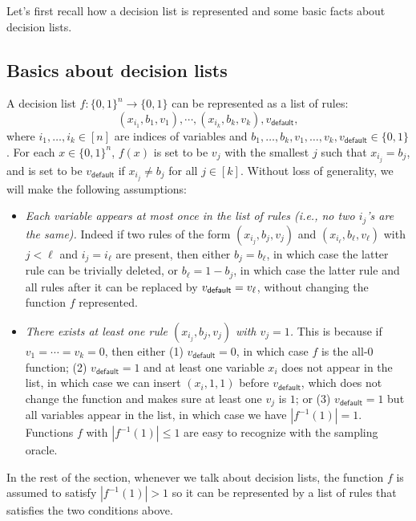 \documentclass[11pt]{article}
\theoremstyle{definition}
\begin{document}
Let's first recall how   
 a decision list is represented and some basic facts about decision lists.

\subsection{Basics about decision lists} \label{sec:basics-DL}

A decision list $f:\{0,1\}^n\rightarrow \{0,1\}$ can 
  be represented as a list of rules:$$
(x_{i_1}, b_1, v_1), \cdots, (x_{i_k}, b_k, v_k), v_{\textsf{default}},
$$
where $i_1,\ldots,i_k\in [n]$ are indices of variables
  and $b_1,\ldots,b_k,v_1,\ldots,v_k,v_{\textsf{default}}\in \{0,1\}$.
For each $x\in \{0,1\}^n$, $f(x)$ is set to be $v_j$ with the
  smallest $j$ such that $x_{i_j}=b_j$, and is set to be
  $v_{\textsf{default}}$ if $x_{i_j}\ne b_j$ for all $j\in [k]$.
Without loss of generality, we will make the following assumptions:
\begin{flushleft}\begin{itemize}
    \item \emph{Each variable appears at most once in the list of rules (i.e., no two $i_j$'s are the same).} Indeed if two rules of the form $(x_{i_j}, b_j,v_j)$ and $(x_{i_{\ell}}, b_{\ell}, v_{\ell})$ with $j<\ell$ and $i_j=i_{\ell}$ are present,  
    then either $b_j=b_{\ell}$, in which case 
    the latter rule can be trivially deleted,
    or $b_{\ell}=1-b_j$, in which case the latter rule and all rules after it can be replaced by $v_{\mathsf{default}}=v_{\ell}$, without changing the 
    function $f$ represented. 
    \item \emph{There exists at least one rule $(x_{i_j},b_j,v_j)$ with $v_j=1$.}
    This is because if $v_1=\cdots=v_k=0$, then either (1) $v_{\textsf{default}}=0$, in which case $f$ is the all-$0$ function; (2) $v_{\textsf{default}}=1$ and at least one variable $x_i$ does not appear in the list, in which case we can insert $(x_i,1,1)$ before $v_{\textsf{default}}$, which does not change the function and makes sure at least one $v_j$ is $1$; or (3) $v_{\textsf{default}}=1$ but all variables appear in the list, in which case we have $|f^{-1}(1)|=1$. Functions $f$ with $|f^{-1}(1)|\le 1$ are easy to recognize with the sampling oracle.
\end{itemize}\end{flushleft}
In the rest of the section, whenever we talk about 
  decision lists, the function $f$ is assumed to satisfy $|f^{-1}(1)|>1$ so it can be represented by a list of rules that satisfies the two conditions above.
\end{document}
